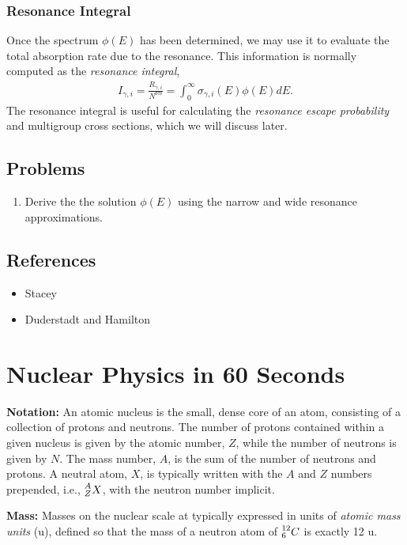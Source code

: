 \documentclass[11pt]{article}
\newcommand\leftidx[3]{{\vphantom{#2}}#1#2#3}
\begin{document}
\subsubsection{Resonance Integral}
\label{sec:orgheadline39}
Once the spectrum \(\phi(E)\) has been determined, we may use it to evaluate the total absorption rate due to the resonance.  This information is normally computed as the \emph{resonance integral},
\begin{align}
  I_{\gamma,i} = \frac{R_{\gamma,i}}{N^\text{res}} = \int_0^\infty \sigma_{\gamma,i}(E) \phi(E) dE.
\end{align}
The resonance integral is useful for calculating the \emph{resonance escape probability} and multigroup cross sections, which we will discuss later.
\subsection{Problems}
\label{sec:orgheadline41}
\begin{enumerate}
\item Derive the the solution \(\phi(E)\) using the narrow and wide resonance approximations.
\end{enumerate}
\subsection{References}
\label{sec:orgheadline42}
\begin{itemize}
\item Stacey
\item Duderstadt and Hamilton
\end{itemize}
\section{Nuclear Physics in 60 Seconds}
\label{sec:orgheadline44}
\textbf{Notation:} An atomic nucleus is the small, dense core of an atom, consisting of a collection of protons and neutrons.  The number of protons contained within a given nucleus is given by the atomic number, \(Z\), while the number of neutrons is given by \(N\).  The mass number, \(A\), is the sum of the number of neutrons and protons.  A neutral atom, \(X\), is typically written with the \(A\) and \(Z\) numbers prepended, i.e., \(\leftidx{^A_Z}{X}{}\), with the neutron number implicit.

\textbf{Mass:} Masses on the nuclear scale at typically expressed in units of \emph{atomic mass units} (u), defined so that the mass of a neutron atom of \(\leftidx{^{12}_6}{C}{}\) is exactly 12 u.
\end{document}
